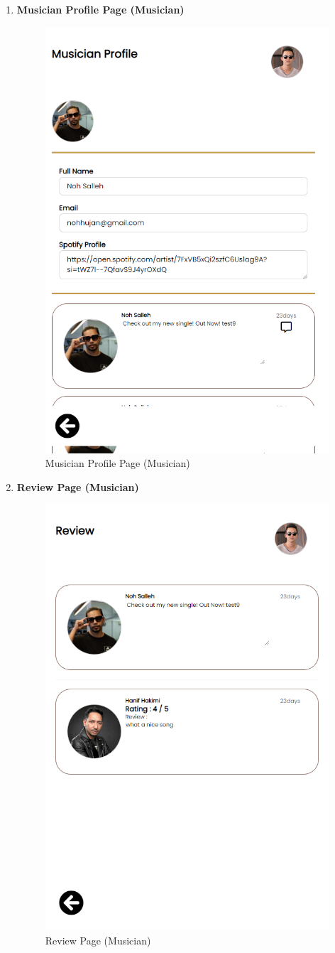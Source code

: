 \begin{enumerate}[1.]
    \item \textbf{Musician Profile Page (Musician)}
    \begin{figure}[h]
        \centering
        \includegraphics[width=0.5\linewidth]{mainmatter/images/frontend/ss/Musician Profile (Musician).png}
        \caption{Musician Profile Page (Musician)}
        \label{fig:myfig57}
    \end{figure}

    \item \textbf{Review Page (Musician)}
    \begin{figure}[h]
        \centering
        \includegraphics[width=0.5\linewidth]{mainmatter/images/frontend/ss/Review (Musician).png}
        \caption{Review Page (Musician)}
        \label{fig:myfig58}
    \end{figure}


\end{enumerate}
